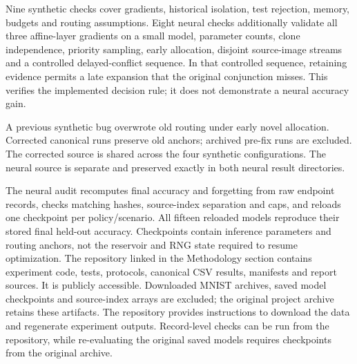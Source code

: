 Nine synthetic checks cover gradients, historical isolation, test rejection, memory, budgets and routing assumptions. Eight neural checks additionally validate all three affine-layer gradients on a small model, parameter counts, clone independence, priority sampling, early allocation, disjoint source-image streams and a controlled delayed-conflict sequence. In that controlled sequence, retaining evidence permits a late expansion that the original conjunction misses. This verifies the implemented decision rule; it does not demonstrate a neural accuracy gain.

A previous synthetic bug overwrote old routing under early novel allocation. Corrected canonical runs preserve old anchors; archived pre-fix runs are excluded. The corrected source is shared across the four synthetic configurations. The neural source is separate and preserved exactly in both neural result directories.

The neural audit recomputes final accuracy and forgetting from raw endpoint records, checks matching hashes, source-index separation and caps, and reloads one checkpoint per policy/scenario. All fifteen reloaded models reproduce their stored final held-out accuracy. Checkpoints contain inference parameters and routing anchors, not the reservoir and RNG state required to resume optimization. The repository linked in the Methodology section contains experiment code, tests, protocols, canonical CSV results, manifests and report sources. It is publicly accessible. Downloaded MNIST archives, saved model checkpoints and source-index arrays are excluded; the original project archive retains these artifacts. The repository provides instructions to download the data and regenerate experiment outputs. Record-level checks can be run from the repository, while re-evaluating the original saved models requires checkpoints from the original archive.

